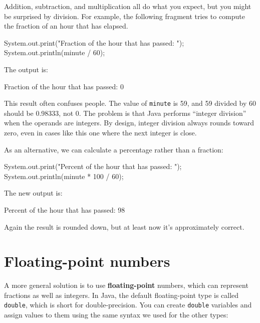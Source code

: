 \documentclass[12pt]{book}
\theoremstyle{exercise}
\newcommand{\java}[1]{\verb"#1"}
\begin{document}
Addition, subtraction, and multiplication all do what you expect, but you might be surprised by division.
For example, the following fragment tries to compute the fraction of an hour that has elapsed.%

\begin{code}
    System.out.print("Fraction of the hour that has passed: ");
    System.out.println(minute / 60);
\end{code}

The output is:

\begin{stdout}
Fraction of the hour that has passed: 0
\end{stdout}


This result often confuses people.
The value of \java{minute} is 59, and 59 divided by 60 should be 0.98333, not 0.
The problem is that Java performs ``integer division'' when the operands are integers.
By design, integer division always rounds toward zero, even in cases like this one where the next integer is close.

As an alternative, we can calculate a percentage rather than a fraction:

\begin{code}
    System.out.print("Percent of the hour that has passed: ");
    System.out.println(minute * 100 / 60);
\end{code}

The new output is:

\begin{stdout}
Percent of the hour that has passed: 98
\end{stdout}

Again the result is rounded down, but at least now it's approximately correct.


\section{Floating-point numbers}


A more general solution is to use {\bf floating-point} numbers, which can represent fractions as well as integers.
In Java, the default floating-point type is called \java{double}, which is short for double-precision.
You can create \java{double} variables and assign values to them using the same syntax we used for the other types:
\end{document}
